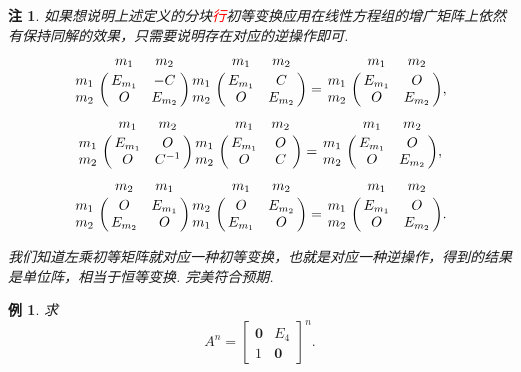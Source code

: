 \documentclass[10pt,openany]{article}
\theoremstyle{thmstyle} %
\theoremstyle{defstyle} %
\theoremstyle{prostyle} %
\theoremstyle{exastyle}
\newtheorem{example}[theorem]{例}
\theoremstyle{remstyle}
\newtheorem{remark}[theorem]{注}
\begin{document}
\begin{remark}
	如果想说明上述定义的分块\textcolor{red}{行}初等变换应用在线性方程组的增广矩阵上依然有保持同解的效果，只需要说明存在对应的逆操作即可. 
	\[ \bordermatrix{
		& m_1 & m_2 \cr
		m_1 & E_{m_1} & -C \cr
		m_2 & O & E_{m_2}
	}\bordermatrix{
		& m_1 & m_2 \cr
		m_1 & E_{m_1} & C \cr
		m_2 & O & E_{m_2}
	}=\bordermatrix{
	& m_1 & m_2 \cr
	m_1 & E_{m_1} & O \cr
	m_2 & O & E_{m_2}
	}, \]
	\[ \bordermatrix{
		& m_1 & m_2 \cr
		m_1 & E_{m_1} & O  \cr
		m_2 & O & C^{-1}
	}\bordermatrix{
		& m_1 & m_2 \cr
		m_1 & E_{m_1} & O  \cr
		m_2 & O & C
	}=\bordermatrix{
	& m_1 & m_2 \cr
	m_1 & E_{m_1} & O  \cr
	m_2 & O & E_{m_2}
	},\]
	\[ \bordermatrix{
		& m_2 & m_1 \cr
		m_1 & O & E_{m_1} \cr
		m_2 & E_{m_2} & O
	}\bordermatrix{
		& m_1 & m_2 \cr
		m_2 & O & E_{m_2} \cr
		m_1 & E_{m_1} & O
	}=\bordermatrix{
	& m_1 & m_2 \cr
	m_1 & E_{m_1} & O \cr
	m_2 & O & E_{m_2}
	}. \]
	
	我们知道左乘初等矩阵就对应一种初等变换，也就是对应一种逆操作，得到的结果是单位阵，相当于恒等变换. 完美符合预期.
\end{remark}

\begin{example} \label{1.4.4}
	求
	\[ A^n=\begin{bmatrix}
		\bm{0} & E_4 \\ 1 & \bm{0}
	\end{bmatrix}^n. \]
\end{example}
\end{document}

